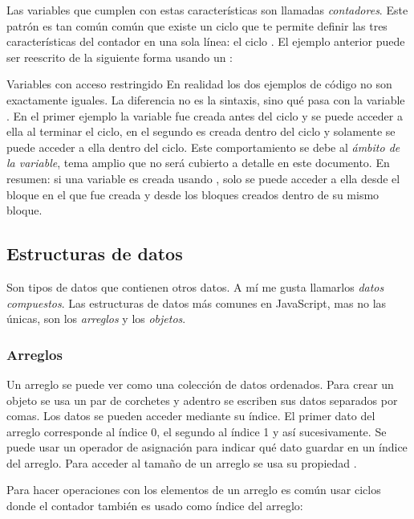 \documentclass{article}
\newcommand{\code}[1]{\tcbox{\texttt{#1}}}
\newcommand{\codejs}[1]{\tcbox{\lstinline[style=ES6]{#1}}}
\newcommand{\jsfile}[2]{}
\newenvironment{info}[1]
  {\begin{bclogo}[logo=\bcinfo, couleurBarre=orange, noborder=true, couleur=white]{#1}}
  {\end{bclogo}}
\begin{document}
Las variables que cumplen con estas características son llamadas \textit{contadores}. Este patrón es tan común común que existe un ciclo que te permite definir las tres características del contador en una sola línea: el ciclo \codejs{for}. El ejemplo anterior puede ser reescrito de la siguiente forma usando un \codejs{for}:
\jsfile{Ciclo finito usando \codejs{for}}{code/cicles/for.js}

\begin{info}{Variables con acceso restringido}
En realidad los dos ejemplos de código no son exactamente iguales. La diferencia no es la sintaxis, sino qué pasa con la variable \codejs{número}. En el primer ejemplo la variable fue creada antes del ciclo \codejs{while} y se puede acceder a ella al terminar el ciclo, en el segundo es creada dentro del ciclo \codejs{for} y solamente se puede acceder a ella dentro del ciclo. Este comportamiento se debe al \textit{ámbito de la variable}\cite{scope}, tema amplio que no será cubierto a detalle en este documento. En resumen: si una variable es creada usando \codejs{let}, solo se puede acceder a ella desde el bloque en el que fue creada y desde los bloques creados dentro de su mismo bloque.
\end{info}


\subsection{Estructuras de datos}
Son tipos de datos que contienen otros datos. A mí me gusta llamarlos \textit{datos compuestos}. Las estructuras de datos más comunes en JavaScript, mas no las únicas, son los \textit{arreglos} y los \textit{objetos}.
\subsubsection{Arreglos}
Un arreglo se puede ver como una colección de datos ordenados. Para crear un objeto se usa un par de corchetes \codejs{[ ]} y adentro se escriben sus datos separados por comas. Los datos se pueden acceder mediante su índice. El primer dato del arreglo corresponde al índice 0, el segundo al índice 1 y así sucesivamente. Se puede usar un operador de asignación para indicar qué dato guardar en un índice del arreglo. Para acceder al tamaño de un arreglo se usa su propiedad \code{length}.
\jsfile{Crear, acceder y modificar un arreglo}{code/data-structures/arrays.js}

Para hacer operaciones con los elementos de un arreglo es común usar ciclos donde el contador también es usado como índice del arreglo:
\jsfile{Ciclar un arreglo}{code/data-structures/arrays-in-for.js}
\end{document}
